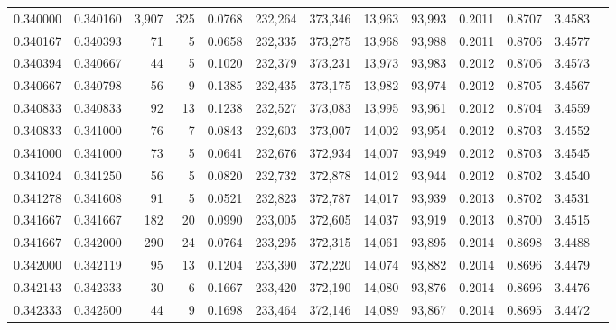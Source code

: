 \begin{tabular}{rrrrrrrrrrrrr}
0.340000 & 0.340160 & 3,907 & 325 &                                     0.0768 & 232,264 & 373,346 &  13,963 &  93,993 & 0.2011 & 0.8707 & 3.4583 \\
0.340167 & 0.340393 &    71 &   5 &                                     0.0658 & 232,335 & 373,275 &  13,968 &  93,988 & 0.2011 & 0.8706 & 3.4577 \\
0.340394 & 0.340667 &    44 &   5 &                                     0.1020 & 232,379 & 373,231 &  13,973 &  93,983 & 0.2012 & 0.8706 & 3.4573 \\
0.340667 & 0.340798 &    56 &   9 &                                     0.1385 & 232,435 & 373,175 &  13,982 &  93,974 & 0.2012 & 0.8705 & 3.4567 \\
0.340833 & 0.340833 &    92 &  13 &                                     0.1238 & 232,527 & 373,083 &  13,995 &  93,961 & 0.2012 & 0.8704 & 3.4559 \\
0.340833 & 0.341000 &    76 &   7 &                                     0.0843 & 232,603 & 373,007 &  14,002 &  93,954 & 0.2012 & 0.8703 & 3.4552 \\
0.341000 & 0.341000 &    73 &   5 &                                     0.0641 & 232,676 & 372,934 &  14,007 &  93,949 & 0.2012 & 0.8703 & 3.4545 \\
0.341024 & 0.341250 &    56 &   5 &                                     0.0820 & 232,732 & 372,878 &  14,012 &  93,944 & 0.2012 & 0.8702 & 3.4540 \\
0.341278 & 0.341608 &    91 &   5 &                                     0.0521 & 232,823 & 372,787 &  14,017 &  93,939 & 0.2013 & 0.8702 & 3.4531 \\
0.341667 & 0.341667 &   182 &  20 &                                     0.0990 & 233,005 & 372,605 &  14,037 &  93,919 & 0.2013 & 0.8700 & 3.4515 \\
0.341667 & 0.342000 &   290 &  24 &                                     0.0764 & 233,295 & 372,315 &  14,061 &  93,895 & 0.2014 & 0.8698 & 3.4488 \\
0.342000 & 0.342119 &    95 &  13 &                                     0.1204 & 233,390 & 372,220 &  14,074 &  93,882 & 0.2014 & 0.8696 & 3.4479 \\
0.342143 & 0.342333 &    30 &   6 &                                     0.1667 & 233,420 & 372,190 &  14,080 &  93,876 & 0.2014 & 0.8696 & 3.4476 \\
0.342333 & 0.342500 &    44 &   9 &                                     0.1698 & 233,464 & 372,146 &  14,089 &  93,867 & 0.2014 & 0.8695 & 3.4472 \\

\end{tabular}
